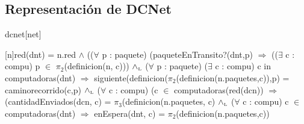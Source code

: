 \begin{Representacion}
  
  \section*{Representación de DCNet}

  \begin{Estructura}{dcnet}[net]
    \begin{Tupla}[net]
    \end{Tupla}
  
  
  \begin{Tupla}[infoPaquetes]
    \end{Tupla}
  \end{Estructura}


  \Rep[net][n]{}\mbox{}


  [n]{red(dnt) = n.red  $\land$ (($\forall$ p : paquete) (paqueteEnTransito?(dnt,p) $\Rightarrow$ (($\exists$ c : compu) p $\in$ $\pi_2$(definicion(n, c))) $\land_{\mathrm{\scriptscriptstyle{L}}}$
 ($\forall$ p : paquete) ($\exists$ c : compu) c in computadoras(dnt) $\Rightarrow$ siguiente(definicion($\pi_2$(definicion(n.paquetes,c)),p) = caminorecorrido(c,p)  $\land_{\mathrm{\scriptscriptstyle{L}}}$
($\forall$ c : compu) (c $\in$ computadoras(red(dcn)) $\Rightarrow$ (cantidadEnviados(dcn, c) = $\pi_3$(definicion(n.paquetes, c) $\land_{\mathrm{\scriptscriptstyle{L}}}$ 
($\forall$ c : compu) c $\in$ computadoras(dnt) $\Rightarrow$ enEspera(dnt, c) = $\pi_2$(definicion(n.paquetes,c))}

\end{Representacion}



